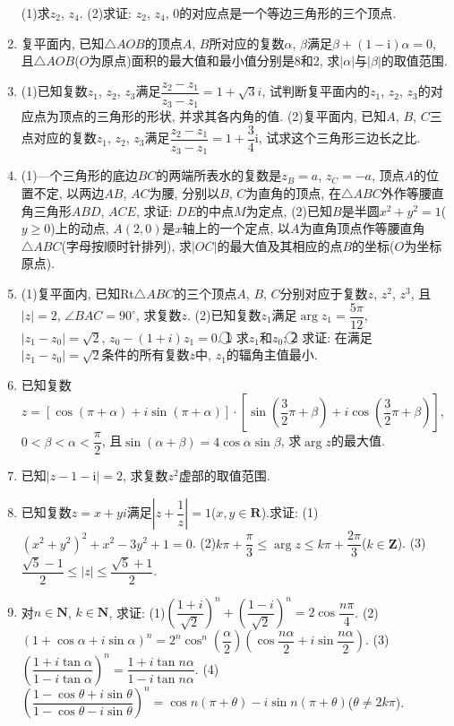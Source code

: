 \documentclass[10pt,a4paper]{article}
\begin{document}
\begin{enumerate}[1.]
(1)求$z_2$, $z_4$.
(2)求证: $z_2$, $z_4$, 0的对应点是一个等边三角形的三个顶点.
\item 复平面内, 已知$\triangle AOB$的顶点$A$, $B$所对应的复数$\alpha$, $\beta$满足$\beta +(1-\mathrm{i})\alpha =0$, 且$\triangle AOB$($O$为原点)面积的最大值和最小值分别是8和2, 求$|\alpha|$与$|\beta|$的取值范围.
\item (1)已知复数$z_1$, $z_2$, $z_3$满足$\dfrac{{z_2}-{z_1}}{{z_3}-{z_1}}=1+\sqrt 3i$, 试判断复平面内的$z_1$, $z_2$, $z_3$的对应点为顶点的三角形的形状, 并求其各内角的值.
(2)复平面内, 已知$A$, $B$, $C$三点对应的复数$z_1$, $z_2$, $z_3$满足$\dfrac{{z_2}-{z_1}}{{z_3}-{z_1}}=1+\dfrac 34\mathrm{i}$, 试求这个三角形三边长之比.
\item (1)—个三角形的底边$BC$的两端所表水的复数是$z_B=a$, $z_C=-a$, 顶点$A$的位置不定, 以两边$AB$, $AC$为腰, 分别以$B$, $C$为直角的顶点, 在$\triangle ABC$外作等腰直角三角形$ABD$, $ACE$, 求证: $DE$的中点$M$为定点,
(2)已知$B$是半圆$x^2+y^2=1$($y\ge 0$)上的动点, $A(2,0)$是$x$轴上的一个定点, 以$A$为直角顶点作等腰直角$\triangle ABC$(字母按顺时针排列), 求$|OC|$的最大值及其相应的点$B$的坐标($O$为坐标原点).
\item (1)复平面内, 已知Rt$\triangle ABC$的三个顶点$A$, $B$, $C$分别对应于复数$z$, $z^2$, $z^3$, 且$|z|=2$, $\angle BAC=90^{\circ }$, 求复数$z$.
(2)已知复数$z_1$满足$\arg z_1=\dfrac{5\pi }{12}$, $|z_1-z_0|=\sqrt 2$, $z_0-(1+i)z_1=0$.
\textcircled{1} 求$z_1$和$z_0$;
\textcircled{2} 求证: 在满足$|z_1-z_0|=\sqrt 2$条件的所有复数$z$中, $z_1$的辐角主值最小.
\item 已知复数$z=[\cos (\pi +\alpha)+i\sin (\pi +\alpha)]\cdot [\sin (\dfrac 32\pi +\beta)+i\cos (\dfrac 32\pi +\beta)]$, $0<\beta <\alpha <\dfrac{\pi }2$, 且$\sin (\alpha +\beta)=4\cos \alpha \sin \beta$, 求$\arg z$的最大值.
\item 已知$|z-1-\mathrm{i}|=2$, 求复数$z^2$虚部的取值范围.
\item 已知复数$z=x+yi$满足$|z+\dfrac 1z|=1$($x,y\in \mathbf{R}$).求证:
(1)$(x^2+y^2)^2+x^2-3y^2+1=0$.
(2)$k\pi +\dfrac{\pi }3\le \arg z\le k\pi +\dfrac{2\pi }3$($k\in \mathbf{Z}$).
(3)$\dfrac{\sqrt 5-1}2\le|z|\le \dfrac{\sqrt 5+1}2$.
\item 对$n\in \mathbf{N}$, $k\in \mathbf{N}$, 求证:
(1)$(\dfrac{1+i}{\sqrt 2})^n+(\dfrac{1-i}{\sqrt 2})^n=2\cos \dfrac{n\pi }4$.
(2)$(1+\cos \alpha +i\sin \alpha)^n=2^n\cos ^n(\dfrac{\alpha }2)(\cos \dfrac{n\alpha }2+i\sin \dfrac{n\alpha }2)$.
(3)$(\dfrac{1+i\tan \alpha }{1-i\tan \alpha })^n=\dfrac{1+i\tan n\alpha }{1-i\tan n\alpha }$.
(4)$(\dfrac{1-\cos \theta +i\sin \theta }{1-\cos \theta -i\sin \theta })^n=\cos n(\pi +\theta)-i\sin n(\pi +\theta)$($\theta \ne 2k\pi$).

\end{enumerate}
\end{document}

